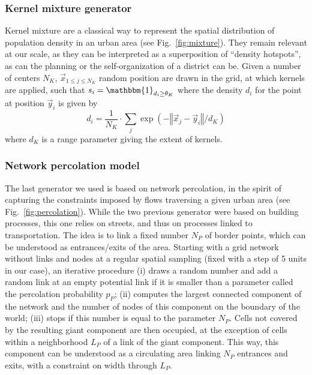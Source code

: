 \documentclass[letterpaper]{article}
\newcommand{\norm}[1]{\left\Vert #1\right\Vert}
\begin{document}
\subsubsection{Kernel mixture generator}

Kernel mixture are a classical way to represent the spatial distribution of population density in an urban area \citep{anas1998urban} (see Fig.~\ref{fig:mixture}). They remain relevant at our scale, as they can be interpreted as a superposition of ``density hotspots'', as can the planning or the self-organization of a district can be. Given a number of centers $N_K$, $\vec{x}_{1\leq j \leq N_K}$ random position are drawn in the grid, at which kernels are applied, such that $s_i = \mathbbm{1}_{d_i \geq \theta_K}$ where the density $d_i$ for the point at position $\vec{y}_i$ is given by
\begin{equation}
    d_i = \frac{1}{N_K}\cdot \sum_j \exp{\left(-\norm{\vec{x}_j - \vec{y}_i}/d_K\right)} 
\end{equation}
where $d_K$ is a range parameter giving the extent of kernels.

\subsubsection{Network percolation model}

The last generator we used is based on network percolation, in the spirit of capturing the constraints imposed by flows traversing a given urban area (see Fig.~\ref{fig:percolation}). While the two previous generator were based on building processes, this one relies on streets, and thus on processes linked to transportation. The idea is to link a fixed number $N_P$ of border points, which can be understood as entrances/exits of the area. Starting with a grid network without links and nodes at a regular spatial sampling (fixed with a step of 5 units in our case), an iterative procedure (i) draws a random number and add a random link at an empty potential link if it is smaller than a parameter called the percolation probability $p_P$; (ii) computes the largest connected component of the network and the number of nodes of this component on the boundary of the world; (iii) stops if this number is equal to the parameter $N_P$. Cells not covered by the resulting giant component are then occupied, at the exception of cells within a neighborhood $L_P$ of a link of the giant component. This way, this component can be understood as a circulating area linking $N_P$ entrances and exits, with a constraint on width through $L_P$.
\end{document}
